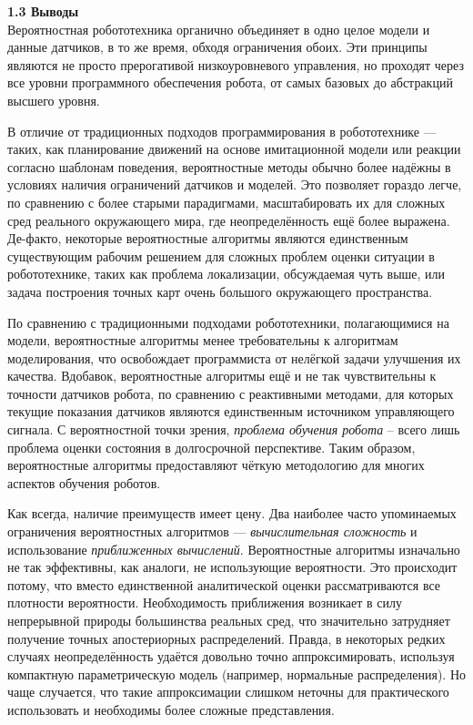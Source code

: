 \documentclass[10pt,a4paper]{article}
\begin{document}
\textbf{1.3 Выводы}\\

Вероятностная робототехника органично объединяет в одно целое модели и данные датчиков, в то же время, обходя ограничения обоих. Эти принципы являются не просто прерогативой низкоуровневого управления, но проходят через все уровни программного обеспечения робота, от самых базовых до абстракций высшего уровня.

В отличие от традиционных подходов программирования в робототехнике — таких, как планирование движений на основе имитационной модели или реакции согласно шаблонам поведения, вероятностные методы обычно более надёжны в условиях наличия ограничений датчиков и моделей. Это позволяет гораздо легче, по сравнению с более старыми парадигмами, масштабировать их для сложных сред реального окружающего мира, где неопределённость  ещё более выражена. Де-факто, некоторые вероятностные алгоритмы являются единственным существующим рабочим решением для сложных проблем оценки ситуации в робототехнике, таких как проблема локализации, обсуждаемая чуть выше, или задача построения точных карт очень большого окружающего пространства.

По сравнению с традиционными подходами робототехники, полагающимися на модели, вероятностные алгоритмы менее требовательны к алгоритмам моделирования, что освобождает программиста от нелёгкой задачи улучшения их качества. Вдобавок, вероятностные алгоритмы ещё и не так чувствительны к точности датчиков робота, по сравнению с реактивными методами, для которых текущие показания датчиков являются единственным источником управляющего сигнала. С вероятностной точки зрения, \textit{проблема обучения робота} – всего лишь проблема оценки состояния в долгосрочной перспективе. Таким образом, вероятностные алгоритмы предоставляют чёткую методологию для многих аспектов обучения роботов.

Как всегда, наличие преимуществ имеет цену. Два наиболее часто упоминаемых ограничения вероятностных алгоритмов — \textit{вычислительная сложность} и использование \textit{приближенных вычислений}. Вероятностные алгоритмы изначально не так эффективны, как аналоги, не использующие вероятности. Это происходит потому, что вместо единственной аналитической оценки рассматриваются все плотности вероятности. Необходимость приближения возникает в силу  непрерывной природы большинства реальных сред, что значительно затрудняет получение точных апостериорных распределений. Правда, в некоторых редких случаях неопределённость удаётся довольно точно аппроксимировать, используя компактную параметрическую модель (например, нормальные распределения). Но чаще случается, что такие аппроксимации слишком неточны для практического использовать и необходимы более сложные представления.
\end{document}
